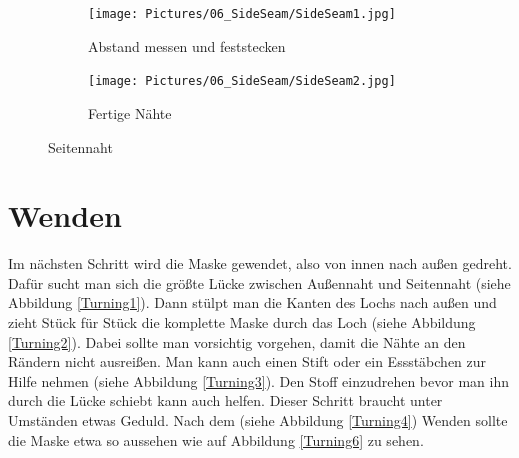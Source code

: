 \documentclass[12pt,parskip=full]{scrartcl}
\begin{document}
\begin{figure}[ht]
    \vspace{0.5cm}
    \centering
    \begin{subfigure}{0.48\textwidth}
        \centering
        \texttt{[image: Pictures/06\_SideSeam/SideSeam1.jpg]}
        \caption{Abstand messen und feststecken}
        \label{SideSeam1}
    \end{subfigure}
    \begin{subfigure}{0.48\textwidth}
        \centering
        \texttt{[image: Pictures/06\_SideSeam/SideSeam2.jpg]}
        \caption{Fertige Nähte}
        \label{SideSeam2}
    \end{subfigure}
    \caption{Seitennaht}
    \label{SideSeam}
\end{figure}

\section{Wenden}
Im nächsten Schritt wird die Maske gewendet, also von innen nach außen gedreht. Dafür sucht man sich die größte Lücke zwischen Außennaht und Seitennaht (siehe Abbildung \ref{Turning1}). Dann stülpt man die Kanten des Lochs nach außen und zieht Stück für Stück die komplette Maske durch das Loch (siehe Abbildung \ref{Turning2}). Dabei sollte man vorsichtig vorgehen, damit die Nähte an den Rändern nicht ausreißen. Man kann auch einen Stift oder ein Essstäbchen zur Hilfe nehmen (siehe Abbildung \ref{Turning3}). Den Stoff einzudrehen bevor man ihn durch die Lücke schiebt kann auch helfen. Dieser Schritt braucht unter Umständen etwas Geduld. Nach dem (siehe Abbildung \ref{Turning4}) Wenden sollte die Maske etwa so aussehen wie auf Abbildung \ref{Turning6} zu sehen.
\end{document}
